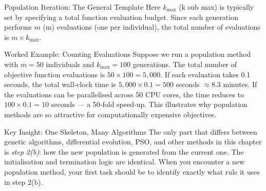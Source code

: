 \documentclass[aspectratio=169,10pt]{beamer}
\begin{document}
\begin{frame}[allowframebreaks]{Population Iteration: The General Template}
  Here $k_{\max}$ (k sub max) is typically set by specifying a total
  function evaluation budget.  Since each generation performs $m$ (m)
  evaluations (one per individual), the total number of evaluations
  is $m \times k_{\max}$.

  \begin{exampleblock}{Worked Example: Counting Evaluations}
    Suppose we run a population method with $m = 50$ individuals
    and $k_{\max} = 100$ generations.  The total number of objective
    function evaluations is $50 \times 100 = 5{,}000$.  If each
    evaluation takes 0.1 seconds, the total wall-clock time is
    $5{,}000 \times 0.1 = 500$ seconds $\approx 8.3$ minutes.
    If the evaluations can be parallelised across 50 CPU cores,
    the time reduces to $100 \times 0.1 = 10$ seconds --- a
    50-fold speed-up.  This illustrates why population methods
    are so attractive for computationally expensive objectives.
  \end{exampleblock}

  \begin{alertblock}{Key Insight: One Skeleton, Many Algorithms}
    The only part that differs between genetic algorithms, differential
    evolution, PSO, and other methods in this chapter is \emph{step
    2(b)}: how the new population is generated from the current one.
    The initialisation and termination logic are identical.  When you
    encounter a new population method, your first task should be to
    identify exactly what rule it uses in step 2(b).
  \end{alertblock}

\end{frame}
\end{document}
